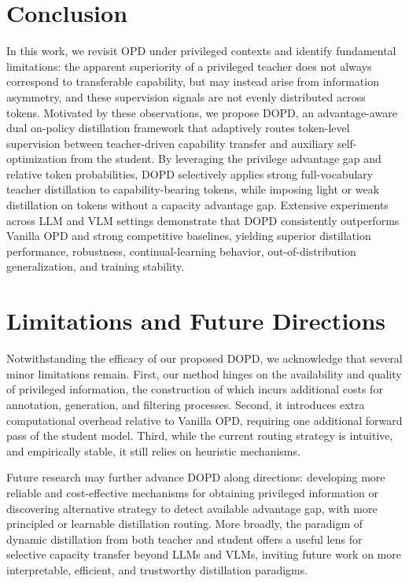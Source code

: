 \documentclass[]{jingdong}
\theoremstyle{plain}
\theoremstyle{definition}
\theoremstyle{remark}
\begin{document}
\section{Conclusion}
In this work, we revisit OPD under privileged contexts and identify fundamental limitations: the apparent superiority of a privileged teacher does not always correspond to transferable capability, but may instead arise from information asymmetry, and these supervision signals are not evenly distributed across tokens.
Motivated by these observations, we propose DOPD, an advantage-aware dual on-policy distillation framework that adaptively routes token-level supervision between teacher-driven capability transfer and auxiliary self-optimization from the student. 
By leveraging the privilege advantage gap and relative token probabilities, DOPD selectively applies strong full-vocabulary teacher distillation to capability-bearing tokens, while imposing light or weak distillation on tokens without a capacity advantage gap.
Extensive experiments across LLM and VLM settings demonstrate that DOPD consistently outperforms Vanilla OPD and strong competitive baselines, yielding superior distillation performance, robustness, continual-learning behavior, out-of-distribution generalization, and training stability. 



\section{Limitations and Future Directions}
Notwithstanding the efficacy of our proposed DOPD, we acknowledge that several minor limitations remain.
First, our method hinges on the availability and quality of privileged information, the construction of which incurs additional costs for annotation, generation, and filtering processes.
Second, it introduces extra computational overhead relative to Vanilla OPD, requiring one additional forward pass of the student model.
Third, while the current routing strategy is intuitive, and empirically stable, it still relies on heuristic mechanisms.




Future research may further advance DOPD along directions: developing more reliable and cost-effective mechanisms for obtaining privileged information or discovering alternative strategy to detect available  advantage gap, with more principled or learnable distillation routing. More broadly, the paradigm of dynamic distillation from both teacher and student offers a useful lens for selective capacity transfer beyond LLMs and VLMs, inviting future work on more interpretable, efficient, and trustworthy distillation paradigms.









\end{document}
